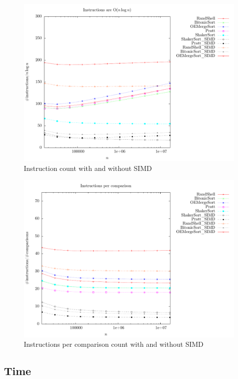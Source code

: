 \begin{figure}
\center
\includegraphics[width=\textwidth]{graphs/SIMD/nlogninstructions.pdf}
\caption{Instruction count with and without SIMD}
\label{fig:SIMD:instructions}
\end{figure}


\begin{figure}
\center
\includegraphics[width=\textwidth]{graphs/SIMD/instructionscomparison.pdf}
\caption{Instructions per comparison count with and without SIMD}
\label{fig:SIMD:instructions:comparisons}
\end{figure}

\subsection{Time}

